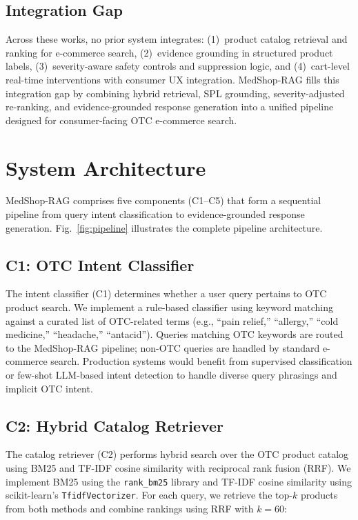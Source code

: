 \documentclass[conference]{IEEEtran}
\begin{document}
\subsection{Integration Gap}

Across these works, no prior system integrates: (1)~product catalog retrieval
and ranking for e-commerce search, (2)~evidence grounding in structured product
labels, (3)~severity-aware safety controls and suppression logic, and
(4)~cart-level real-time interventions with consumer UX integration. MedShop-RAG
fills this integration gap by combining hybrid retrieval, SPL grounding,
severity-adjusted re-ranking, and evidence-grounded response generation into a
unified pipeline designed for consumer-facing OTC e-commerce search.

\section{System Architecture}
\label{sec:arch}

MedShop-RAG comprises five components (C1--C5) that form a sequential pipeline
from query intent classification to evidence-grounded response generation.
Fig.~\ref{fig:pipeline} illustrates the complete pipeline architecture.

\subsection{C1: OTC Intent Classifier}

The intent classifier (C1) determines whether a user query pertains to OTC
product search. We implement a rule-based classifier using keyword matching
against a curated list of OTC-related terms (e.g., ``pain relief,'' ``allergy,''
``cold medicine,'' ``headache,'' ``antacid''). Queries matching OTC keywords are
routed to the MedShop-RAG pipeline; non-OTC queries are handled by standard
e-commerce search. Production systems would benefit from supervised
classification or few-shot LLM-based intent detection to handle diverse query
phrasings and implicit OTC intent.

\subsection{C2: Hybrid Catalog Retriever}

The catalog retriever (C2) performs hybrid search over the OTC product catalog
using BM25 and TF-IDF cosine similarity with reciprocal rank fusion (RRF). We
implement BM25 using the \texttt{rank\_bm25} library and TF-IDF cosine
similarity using scikit-learn's \texttt{TfidfVectorizer}. For each query, we
retrieve the top-$k$ products from both methods and combine rankings using RRF
with $k{=}60$:
\end{document}
